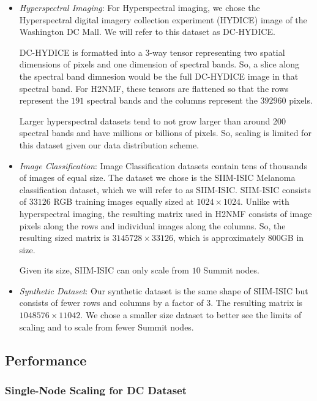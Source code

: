 \documentclass[conference,compsoc]{IEEEtran}
\newcommand{\hyper}{DC-HYDICE}
\newcommand{\image}{SIIM-ISIC}
\begin{document}
\begin{itemize}
	\item \textit{Hyperspectral Imaging}:
	For Hyperspectral imaging, we chose the Hyperspectral digital imagery collection experiment (HYDICE) image of the Washington DC Mall. We will refer
	to this dataset as \hyper{}\cite{DC-HYDICE}.
	
	\hyper{} is formatted into a 3-way tensor representing two spatial dimensions of pixels and one dimension of spectral bands. So, a slice along
	the spectral band dimnesion would be the full \hyper{} image in that spectral band. For H2NMF, these tensors are flattened so that the rows represent the
	$191$ spectral bands and the columns represent the $392960$ pixels. 

	Larger hyperspectral datasets tend to not grow larger than around 200 spectral bands and have millions or billions of pixels. So, scaling is 
	limited for this dataset given our data distribution scheme.
	\item \textit{Image Classification}:
	Image Classification datasets contain tens of thousands of images of equal size. The dataset we chose is the SIIM-ISIC Melanoma classification
	dataset, which we will refer to as \image{}\cite{SIIM-ISIC}. \image{} consists of $33126$ RGB training images equally sized at $1024 \times 1024$. Unlike with hyperspectral imaging, the resulting
	matrix used in H2NMF consists of image pixels along the rows and individual images along the columns. So, the resulting sized matrix is
	$3145728 \times 33126$, which is approximately 800GB in size. 

	Given its size, \image{} can only scale from $10$ Summit nodes.
	\item \textit{Synthetic Dataset}:
	Our synthetic dataset is the same shape of \image{} but consists of fewer rows and columns by a factor of $3$. The resulting matrix is $1048576 \times 11042$. 
	We chose a smaller size dataset to better see the limits of scaling and to scale from fewer Summit nodes.
\end{itemize}

\subsection{Performance}
\label{sec:perf}

\subsubsection{Single-Node Scaling for DC Dataset}
\end{document}

